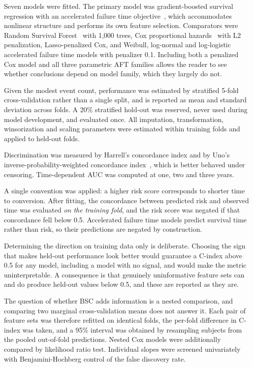 \documentclass[blue]{ludusofficial}  %
\begin{document}
Seven models were fitted. The primary model was gradient-boosted survival regression with an accelerated failure time objective~\cite{barnwal2022survivalxgb}, which accommodates nonlinear structure and performs its own feature selection. Comparators were Random Survival Forest~\cite{ishwaran2008rsf} with 1,000 trees, Cox proportional hazards~\cite{cox1972} with L2 penalization, Lasso-penalized Cox, and Weibull, log-normal and log-logistic accelerated failure time models with penalizer 0.1. Including both a penalized Cox model and all three parametric AFT families allows the reader to see whether conclusions depend on model family, which they largely do not.

Given the modest event count, performance was estimated by stratified 5-fold cross-validation rather than a single split, and is reported as mean and standard deviation across folds. A 20\% stratified hold-out was reserved, never used during model development, and evaluated once. All imputation, transformation, winsorization and scaling parameters were estimated within training folds and applied to held-out folds.

Discrimination was measured by Harrell's concordance index and by Uno's inverse-probability-weighted concordance index~\cite{uno2011cstat}, which is better behaved under censoring. Time-dependent AUC was computed at one, two and three years.

A single convention was applied: a higher risk score corresponds to shorter time to conversion. After fitting, the concordance between predicted risk and observed time was evaluated \textit{on the training fold}, and the risk score was negated if that concordance fell below 0.5. Accelerated failure time models predict survival time rather than risk, so their predictions are negated by construction.

Determining the direction on training data only is deliberate. Choosing the sign that makes held-out performance look better would guarantee a C-index above 0.5 for any model, including a model with no signal, and would make the metric uninterpretable. A consequence is that genuinely uninformative feature sets can and do produce held-out values below 0.5, and these are reported as they are.

The question of whether BSC adds information is a nested comparison, and comparing two marginal cross-validation means does not answer it. Each pair of feature sets was therefore refitted on identical folds, the per-fold difference in C-index was taken, and a 95\% interval was obtained by resampling subjects from the pooled out-of-fold predictions. Nested Cox models were additionally compared by likelihood ratio test. Individual slopes were screened univariately with Benjamini-Hochberg control of the false discovery rate.
\end{document}

